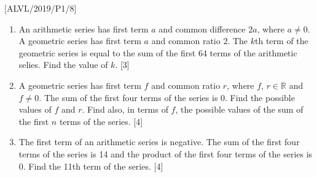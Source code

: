 \item {[}ALVL/2019/P1/8{]}
\begin{enumerate}
\item An arithmetic series has first term $a$ and common difference $2a$,
where $a\neq0$. A geometric series has first term $a$ and common
ratio $2$. The $k$th term of the geometric series is equal to the
sum of the first 64 terms of the arithmetic selies. Find the value
of $k$.\hfill{} {[}3{]}
\item A geometric series has first term $f$ and common ratio $r$, where
$f$, $r\in\mathbb{R}$ and $f\neq0$. The sum of the first four terms
of the series is 0. Find the possible values of $f$ and $r$. Find
also, in terms of $f$, the possible values of the sum of the first
$n$ terms of the series. \hfill{}{[}4{]}
\item The first term of an arithmetic series is negative. The sum of the
first four terms of the series is 14 and the product of the first
four terms of the series is 0. Find the 11th term of the series. \hfill{}{[}4{]}
\end{enumerate}
